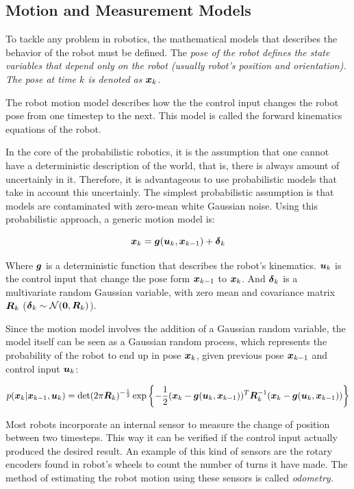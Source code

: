 \subsection{Motion and Measurement Models}

To tackle any problem in robotics, the mathematical models that describes the behavior of the robot must be defined. The \it{pose} of the robot defines the state variables that depend only on the robot (usually robot's position and orientation). The pose at time $k$ is denoted as $\boldsymbol{x}_k$. 

The robot motion model describes how the the control input changes the robot pose from one timestep to the next. This model is called the forward kinematics equations of the robot.

In the core of the probabilistic robotics, it is the assumption that one cannot have a deterministic description of the world, that is, there is always amount of uncertainly in it. Therefore, it is advantageous to use probabilistic models that take in account this uncertainly. The simplest probabilistic assumption is that models are contaminated with zero-mean white Gaussian noise. Using this probabilistic approach, a generic motion model is:

\begin{equation}
\boldsymbol{x}_k = \boldsymbol{g}(\boldsymbol{u}_k, \boldsymbol{x}_{k-1}) + \boldsymbol{\delta}_k
\label{eq:motion-model}
\end{equation}    

Where $\boldsymbol{g}$ is a deterministic function that describes the robot's kinematics. $\boldsymbol{u}_k$ is the control input that change the pose form $\boldsymbol{x}_{k-1}$ to $\boldsymbol{x}_k$. And $\boldsymbol{\delta}_k$ is a multivariate random Gaussian variable, with zero mean and covariance matrix $\boldsymbol{R}_k$ ($\boldsymbol{\delta}_k \sim \mathcal{N}(\boldsymbol{0},\boldsymbol{R}_k)$).

Since the motion model involves the addition of a Gaussian random variable, the model itself can be seen as a Gaussian random process, which represents the probability of the robot to end up in pose $\boldsymbol{x}_k$, given previous pose $\boldsymbol{x}_{k-1}$ and control input $\boldsymbol{u}_k$:

\begin{equation}
p(\boldsymbol{x}_k|\boldsymbol{x}_{k-1},\boldsymbol{u}_k) = \det(2\pi \boldsymbol{R}_k)^{-\frac{1}{2}}\exp\left\lbrace -\frac{1}{2}(\boldsymbol{x}_k-\boldsymbol{g}(\boldsymbol{u}_k,\boldsymbol{x}_{k-1}))^T
\boldsymbol{R}_k^{-1}(\boldsymbol{x}_k-\boldsymbol{g}(\boldsymbol{u}_k,\boldsymbol{x}_{k-1}))\right\rbrace
\label{eq:motion-pdf}
\end{equation}

Most robots incorporate an internal sensor to measure the change of position between two timesteps. This way it can be verified if the control input actually produced the desired result. An example of this kind of sensors are the rotary encoders found in robot's wheels to count the number of turns it have made. The method of estimating the robot motion using these sensors is called \it{odometry}. 

